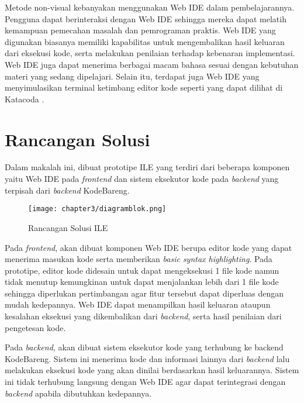 Metode non-visual kebanyakan menggunakan Web IDE dalam pembelajarannya. Pengguna dapat berinteraksi dengan Web IDE sehingga mereka dapat melatih kemampuan pemecahan masalah dan pemrograman praktis. Web IDE yang digunakan biasanya memiliki kapabilitas untuk mengembalikan hasil keluaran dari eksekusi kode, serta melakukan penilaian terhadap kebenaran implementasi. Web IDE juga dapat menerima berbagai macam bahasa sesuai dengan kebutuhan materi yang sedang dipelajari. Selain itu, terdapat juga Web IDE yang menyimulasikan terminal ketimbang editor kode seperti yang dapat dilihat di Katacoda \parencite{katacoda2021media}.

\section{Rancangan Solusi}
Dalam makalah ini, dibuat prototipe ILE yang terdiri dari beberapa komponen yaitu Web IDE pada \textit{frontend} dan sistem eksekutor kode pada \textit{backend} yang terpisah dari \textit{backend} KodeBareng.

\begin{figure}[H]
  \centering
  \texttt{[image: chapter3/diagramblok.png]}
  \caption{Rancangan Solusi ILE}
\end{figure}

Pada \textit{frontend}, akan dibuat komponen Web IDE berupa editor kode yang dapat menerima masukan kode serta memberikan \textit{basic syntax highlighting}. Pada prototipe, editor kode didesain untuk dapat mengeksekusi 1 file kode namun tidak menutup kemungkinan untuk dapat menjalankan lebih dari 1 file kode sehingga diperlukan pertimbangan agar fitur tersebut dapat diperluas dengan mudah kedepannya. Web IDE dapat menampilkan hasil keluaran ataupun kesalahan eksekusi yang dikembalikan dari \textit{backend}, serta hasil penilaian dari pengetesan kode.

Pada \textit{backend}, akan dibuat sistem eksekutor kode yang terhubung ke backend KodeBareng. Sistem ini menerima kode dan informasi lainnya dari \textit{backend} lalu melakukan eksekusi kode yang akan dinilai berdasarkan hasil keluarannya. Sistem ini tidak terhubung langsung dengan Web IDE agar dapat terintegrasi dengan \textit{backend} apabila dibutuhkan kedepannya.